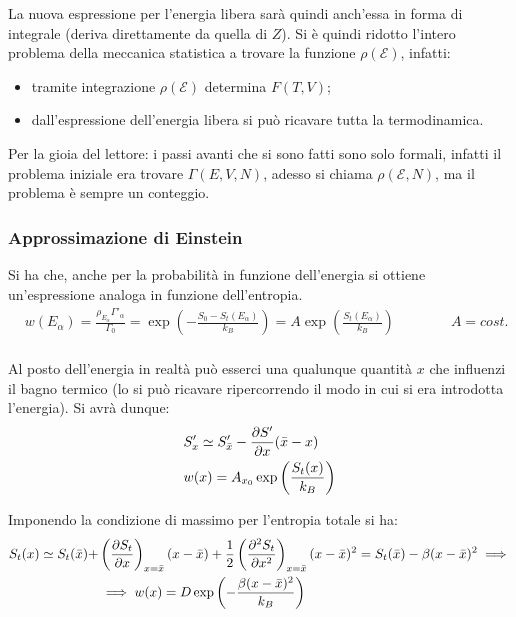 La nuova espressione per l'energia libera sarà quindi anch'essa in forma di integrale (deriva direttamente da quella di $Z$). Si è quindi ridotto l'intero problema della meccanica statistica a trovare la funzione $\rho(\mathcal{E})$, infatti:

\begin{itemize}
	\item tramite integrazione $\rho(\mathcal{E})$ determina $F(T,V)$;
	\item dall'espressione dell'energia libera si può ricavare tutta la termodinamica.
\end{itemize}

Per la gioia del lettore: i passi avanti che si sono fatti sono solo formali, infatti il problema iniziale era trovare $\Gamma(E,V,N)$, adesso si chiama $\rho(\mathcal{E}, N)$, ma il problema è sempre un conteggio.

\subsubsection{Approssimazione di Einstein}

Si ha che, anche per la probabilità in funzione dell'energia si ottiene un'espressione analoga in funzione dell'entropia.
\begin{align*}
&w(E_\alpha) = \frac{\rho_{E_\alpha} \Gamma'_\alpha}{\Gamma_0} = \exp \left(- \frac{S_0 - S_t(E_\alpha)}{k_B}\right) = A \exp \left(\frac{S_t(E_\alpha)}{k_B}\right) \qquad \qquad A = cost.\\
\end{align*}

Al posto dell'energia in realtà può esserci una qualunque quantità $x$ che influenzi il bagno termico (lo si può ricavare ripercorrendo il modo in cui si era introdotta l'energia). Si avrà dunque:
\begin{align*}
&S'_x \simeq S'_{\bar{x}} - \frac{\partial {S'}}{\partial {x}}(\bar{x} - x)\\
&w(x) = A_{x_0} \exp \left(\frac{S_t(x)}{k_B}\right)
\end{align*}

\noindent Imponendo la condizione di massimo per l'entropia totale si ha:
\begin{align*}
S_t(x) \simeq S_t(\bar{x}) + &\left(\frac{\partial {S_t}}{\partial {x}}\right)_{x=\bar{x}}(x - \bar{x}) + \frac{1}{2} \left(\frac{\partial {^2 S_t}}{\partial {x^2}}\right)_{x=\bar{x}}(x - \bar{x})^2 = S_t(\bar{x}) - \beta(x - \bar{x})^2 \implies\\
&\implies w(x) = D \exp \left(-\frac{\beta(x - \bar{x})^2}{k_B}\right)
\end{align*}

